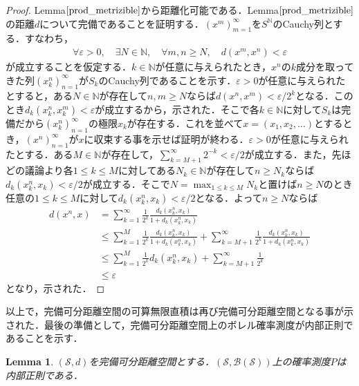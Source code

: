 \documentclass[dvipdfmx,autodetect-engine]{jsarticle}
\newtheorem{lemma}[theorem]{Lemma}
\theoremstyle{remark}
\theoremstyle{definition}
\begin{document}
    
    \begin{proof}
    Lemma$\ref{prod_metrizible}$から距離化可能である．Lemma$\ref{prod_metrizible}$の距離$d$について完備であることを証明する．$(x^m)_{m=1}^{\infty}$を$S^{\mathbb{N}}$のCauchy列とする．すなわち，
    \begin{align}
        \forall \varepsilon >0, \quad \exists N \in \mathbb{N},\quad \forall m,n \geq N, \quad d(x^m ,x^n )<\varepsilon
    \end{align}
    が成立することを仮定する．$k \in \mathbb{N}$が任意に与えられたとき，$x^n$の$k$成分を取ってきた列$(x_k^n)_{n=1}^{\infty}$が$S_k$のCauchy列であることを示す．$\varepsilon>0$が任意に与えられたとすると，ある$N \in \mathbb{N}$が存在して$n,m \geq N$ならば$d(x^n,x^m)<\varepsilon / 2^k$となる．このとき$d_k(x_k^n,x_k^m)<\varepsilon$が成立するから，示された．そこで各$k \in \mathbb{N}$に対して$S_k$は完備だから$(x_k^n)_{n=1}^{\infty}$の極限$x_k$が存在する．これを並べて$x=(x_1,x_2,\ldots)$とするとき，$(x^n)_{n=1}^{\infty}$が$x$に収束する事を示せば証明が終わる．$\varepsilon >0$が任意に与えられたとする．ある$M \in \mathbb{N}$が存在して，$\sum_{k=M+1}^{\infty} 2^{-k} <\varepsilon/2$が成立する．また，先ほどの議論より各$1\leq k\leq M$に対してある$N_k \in \mathbb{N}$が存在して$n \geq N_k$ならば$d_k(x_k^n,x_k) < \varepsilon /2$が成立する．そこで$N = \max_{1\leq k \leq M} N_k$と置けば$n \geq N$のとき任意の$1\leq k\leq M$に対して$d_k(x_k^n,x_k) < \varepsilon /2$となる．よって$n \geq N$ならば
    \begin{align*}
        d(x^n,x) &= \sum_{k=1}^{\infty} \frac{1}{2^k} \frac{d_k(x_k^n,x_k)}{1 + d_k(x_k^n,x_k)} \\
        &\leq \sum_{k=1}^{M} \frac{1}{2^k} \frac{d_k(x_k^n,x_k)}{1 + d_k(x_k^n,x_k)} + \sum_{k=M+1}^{\infty} \frac{1}{2^k} \frac{d_k(x_k^n,x_k)}{1 + d_k(x_k^n,x_k)} \\
        &\leq \sum_{k=1}^{M} \frac{1}{2^k} d_k(x_k^n,x_k) + \sum_{k=M+1}^{\infty} \frac{1}{2^k} \\
        &\leq \varepsilon
    \end{align*}
    となり，示された．
    \end{proof}
    
    
    以上で，完備可分距離空間の可算無限直積は再び完備可分距離空間となる事が示された．最後の準備として，完備可分距離空間上のボレル確率測度が内部正則であることを示す．
    
    
    \begin{lemma}\label{borelprob_radon}
    $(\mathcal{S},d)$を完備可分距離空間とする．$(\mathcal{S},\mathcal{B}(\mathcal{S}))$上の確率測度$P$は内部正則である．
    \end{lemma}
    
\end{document}
